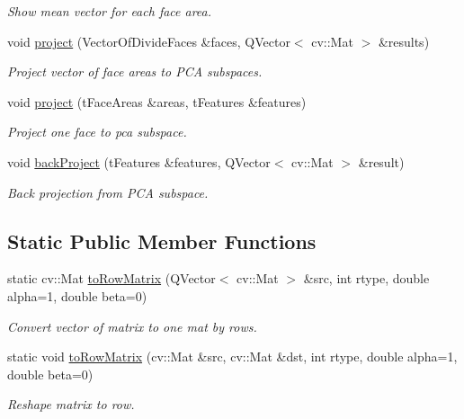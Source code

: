 \begin{DoxyCompactItemize}
\begin{DoxyCompactList}\small\item\em Show mean vector for each face area. \end{DoxyCompactList}\item 
void \hyperlink{class_eigen_face_ae42a4ca20bb01beff27d1f1e4ade0986}{project} (Vector\+Of\+Divide\+Faces \&faces, Q\+Vector$<$ cv\+::\+Mat $>$ \&results)
\begin{DoxyCompactList}\small\item\em Project vector of face areas to P\+C\+A subspaces. \end{DoxyCompactList}\item 
void \hyperlink{class_eigen_face_aa901e0cba6a6946fb30cda548c8078bd}{project} (t\+Face\+Areas \&areas, t\+Features \&features)
\begin{DoxyCompactList}\small\item\em Project one face to pca subspace. \end{DoxyCompactList}\item 
void \hyperlink{class_eigen_face_ad8bb6d36582b3d599fd50d9d568d50ff}{back\+Project} (t\+Features \&features, Q\+Vector$<$ cv\+::\+Mat $>$ \&result)
\begin{DoxyCompactList}\small\item\em Back projection from P\+C\+A subspace. \end{DoxyCompactList}\end{DoxyCompactItemize}
\subsection*{Static Public Member Functions}
\begin{DoxyCompactItemize}
\item 
static cv\+::\+Mat \hyperlink{class_eigen_face_afa5849a05f841161e7dc126a77b7a46f}{to\+Row\+Matrix} (Q\+Vector$<$ cv\+::\+Mat $>$ \&src, int rtype, double alpha=1, double beta=0)
\begin{DoxyCompactList}\small\item\em Convert vector of matrix to one mat by rows. \end{DoxyCompactList}\item 
static void \hyperlink{class_eigen_face_a448782b661039c41b44ac8d509d51923}{to\+Row\+Matrix} (cv\+::\+Mat \&src, cv\+::\+Mat \&dst, int rtype, double alpha=1, double beta=0)
\begin{DoxyCompactList}\small\item\em Reshape matrix to row. \end{DoxyCompactList}\end{DoxyCompactItemize}


